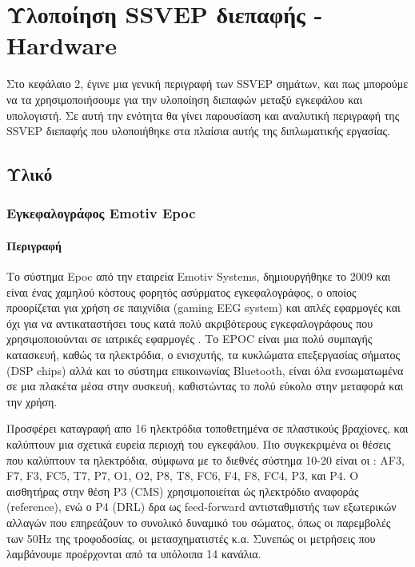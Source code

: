 \documentclass[11pt,a4paper,english,greek,twoside]{../Thesis}
\begin{document}
\chapter{Υλοποίηση SSVEP διεπαφής - Hardware} \label{chap:SSVEP_implementation}
Στο κεφάλαιο 2, έγινε μια γενική περιγραφή των SSVEP σημάτων, και πως μπορούμε να τα χρησιμοποιήσουμε για την υλοποίηση διεπαφών μεταξύ εγκεφάλου και υπολογιστή. Σε αυτή την ενότητα θα γίνει παρουσίαση και αναλυτική περιγραφή της SSVEP διεπαφής που υλοποιήθηκε στα πλαίσια αυτής της διπλωματικής εργασίας.

\section{Υλικό}
\subsection{Εγκεφαλογράφος Emotiv Epoc}
\subsubsection{Περιγραφή}
\par Το σύστημα  Epoc από την εταιρεία Emotiv Systems, δημιουργήθηκε το 2009 και είναι ένας χαμηλού κόστους φορητός ασύρματος εγκεφαλογράφος, ο οποίος προορίζεται για χρήση σε παιχνίδια (gaming EEG system) και απλές εφαρμογές και όχι για να αντικαταστήσει τους κατά πολύ ακριβότερους εγκεφαλογράφους που χρησιμοποιούνται σε ιατρικές εφαρμογές . Το EPOC είναι μια πολύ συμπαγής κατασκευή, καθώς τα ηλεκτρόδια, ο ενισχυτής, τα κυκλώματα επεξεργασίας σήματος (DSP chips) αλλά και το σύστημα επικοινωνίας Bluetooth, είναι όλα ενσωματωμένα σε μια πλακέτα μέσα στην συσκευή, καθιστώντας το πολύ εύκολο στην μεταφορά και την χρήση. 
\par Προσφέρει καταγραφή απο 16 ηλεκτρόδια τοποθετημένα σε πλαστικούς βραχίονες, και  καλύπτουν μια σχετικά ευρεία περιοχή του εγκεφάλου. Πιο συγκεκριμένα οι θέσεις που καλύπτουν τα ηλεκτρόδια, σύμφωνα με το διεθνές σύστημα 10-20 είναι οι : AF3, F7, F3, FC5, T7, P7, O1, O2, P8, T8, FC6, F4, F8, FC4, P3, και P4. Ο αισθητήρας στην θέση P3 (CMS) χρησιμοποιείται ώς ηλεκτρόδιο αναφοράς (reference), ενώ ο P4 (DRL) δρα ως feed-forward αντισταθμιστής των εξωτερικών αλλαγών που επηρεάζουν το συνολικό δυναμικό του σώματος, όπως οι παρεμβολές των 50Hz της τροφοδοσίας, οι μετασχηματιστές κ.α. Συνεπώς οι μετρήσεις που λαμβάνουμε προέρχονται από τα υπόλοιπα 14 κανάλια.
\end{document}
